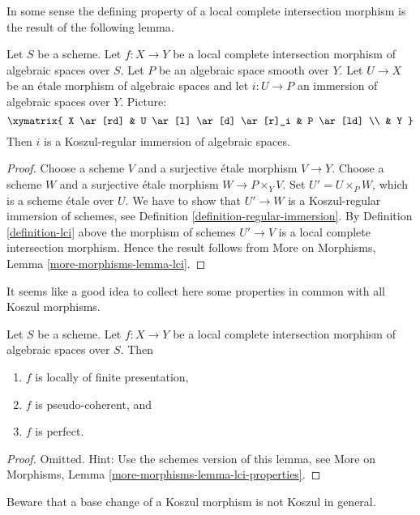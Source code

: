 \noindent
In some sense the defining property of a local complete intersection
morphism is the result of the following lemma.

\begin{lemma}
\label{lemma-lci}
Let $S$ be a scheme.
Let $f : X \to Y$ be a local complete intersection morphism
of algebraic spaces over $S$.
Let $P$ be an algebraic space smooth over $Y$.
Let $U \to X$ be an \'etale morphism of algebraic spaces
and let $i : U \to P$ an immersion of algebraic spaces over $Y$.
Picture:
$$
\xymatrix{
X \ar[rd] & U \ar[l] \ar[d] \ar[r]_i & P \ar[ld] \\
& Y
}
$$
Then $i$ is a Koszul-regular immersion of algebraic spaces.
\end{lemma}

\begin{proof}
Choose a scheme $V$ and a surjective \'etale morphism $V \to Y$.
Choose a scheme $W$ and a surjective \'etale morphism $W \to P \times_Y V$.
Set $U' = U \times_P W$, which is a scheme \'etale over $U$.
We have to show that $U' \to W$ is a Koszul-regular immersion of
schemes, see
Definition \ref{definition-regular-immersion}.
By
Definition \ref{definition-lci}
above the morphism of schemes $U' \to V$ is a local complete intersection
morphism. Hence the result follows from
More on Morphisms, Lemma \ref{more-morphisms-lemma-lci}.
\end{proof}

\noindent
It seems like a good idea to collect here some properties in common
with all Koszul morphisms.

\begin{lemma}
\label{lemma-lci-properties}
Let $S$ be a scheme. Let $f : X \to Y$ be a local complete intersection
morphism of algebraic spaces over $S$. Then
\begin{enumerate}
\item $f$ is locally of finite presentation,
\item $f$ is pseudo-coherent, and
\item $f$ is perfect.
\end{enumerate}
\end{lemma}

\begin{proof}
Omitted. Hint: Use the schemes version of this lemma, see
More on Morphisms,
Lemma \ref{more-morphisms-lemma-lci-properties}.
\end{proof}

\noindent
Beware that a base change of a Koszul morphism is not Koszul in general.

